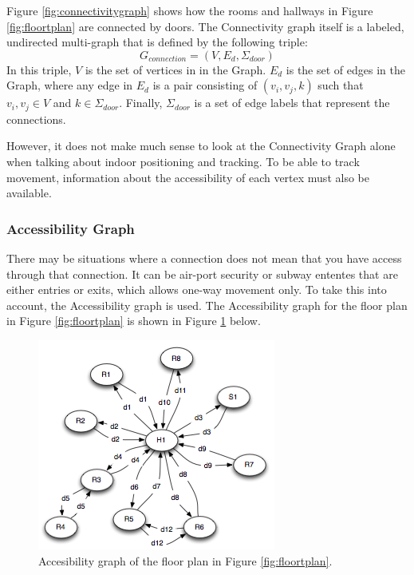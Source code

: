 Figure \ref{fig:connectivitygraph} shows how the rooms and hallways in Figure \ref{fig:floortplan} are connected by doors. 
The Connectivity graph itself is a labeled, undirected multi-graph that is defined by the following triple: \\

\begin{equation}
G_{connection} = (V, E_d, \Sigma_{door})
\end{equation}
In this triple, $V$ is the set of vertices in in the Graph. 
$E_d$ is the set of edges in the Graph, where any edge in $E_d$ is a pair consisting of $({v_i, v_j}, k)$ such that $v_i, v_j \in V$ and $k \in \Sigma_{door}$.
Finally, $\Sigma_{door}$ is a set of edge labels that represent the connections. 

However, it does not make much sense to look at the Connectivity Graph alone when talking about indoor positioning and tracking. 
To be able to track movement, information about the accessibility of each vertex must also be available. 

\subsubsection{ \quad Accessibility Graph}
There may be situations where a connection does not mean that you have access through that connection.
It can be air-port security or subway ententes that are either entries or exits, which allows one-way movement only.
To take this into account, the Accessibility graph is used. 
The Accessibility graph for the floor plan in Figure \ref{fig:floortplan} is shown in Figure \ref{fig:accesibbilitygraph} below.

\begin{figure}[H]%
\includegraphics[width=\columnwidth]{images/accessibilitygraph.png}%
\caption{Accesibility graph of the floor plan in Figure \ref{fig:floortplan}.} %
\label{fig:accesibbilitygraph}%
\end{figure}%

